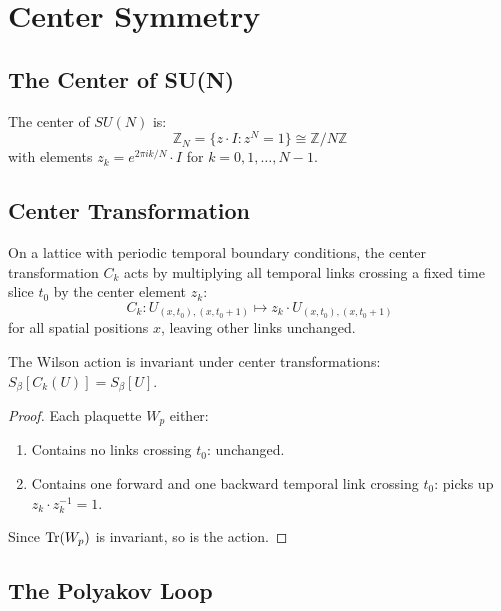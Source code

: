 \section{Center Symmetry}
\label{sec:center}

\subsection{The Center of SU(N)}

The center of $SU(N)$ is:
\[
\mathbb{Z}_N = \{z \cdot I : z^N = 1\} \cong \mathbb{Z}/N\mathbb{Z}
\]
with elements $z_k = e^{2\pi ik/N} \cdot I$ for $k = 0, 1, \ldots, N-1$.

\subsection{Center Transformation}

\begin{definition}
On a lattice with periodic temporal boundary conditions, the center 
transformation $C_k$ acts by multiplying all temporal links crossing a 
fixed time slice $t_0$ by the center element $z_k$:
\[
C_k : U_{(x,t_0),(x,t_0+1)} \mapsto z_k \cdot U_{(x,t_0),(x,t_0+1)}
\]
for all spatial positions $x$, leaving other links unchanged.
\end{definition}

\begin{lemma}
\label{lem:action-inv}
The Wilson action is invariant under center transformations: $S_\beta[C_k(U)] = S_\beta[U]$.
\end{lemma}

\begin{proof}
Each plaquette $W_p$ either:
\begin{enumerate}[label=(\alph*)]
\item Contains no links crossing $t_0$: unchanged.
\item Contains one forward and one backward temporal link crossing $t_0$: 
picks up $z_k \cdot z_k^{-1} = 1$.
\end{enumerate}
Since $\operatorname{Tr}(W_p)$ is invariant, so is the action.
\end{proof}

\subsection{The Polyakov Loop}

